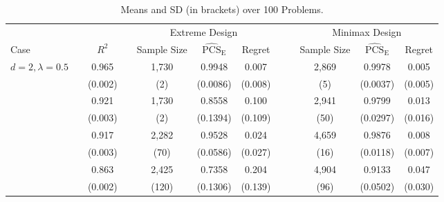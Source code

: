 \documentclass[ijoc,nonblindrev]{informs3}
\def\APCSE{\widehat{\mathrm{PCS}}_{\mathrm{E}}}
\begin{document}
\begin{table}[p]
\centering
\small
\caption{Means and SD (in brackets) over 100 Problems.} \label{tab-PCSE-sd}
\begin{tabular}{lccccccccccc}
\toprule
& & & & \multicolumn{3}{c}{Extreme Design} & & & \multicolumn{3}{c}{Minimax Design} \\
\cmidrule(lr){5-7} \cmidrule(lr){10-12}
Case & & $R^2$ & & Sample Size&  $\APCSE$ & Regret & & & Sample Size&  $\APCSE$ & Regret\\
\midrule
\multirow{2}{*}{$d=2, \lambda=0.5$} & & 0.965 & & 1,730 & 0.9948   & 0.007 & & & 2,869 & 0.9978  & 0.005  \\
                                   & & (0.002)& & (2)   & (0.0086) & (0.008)  & & & (5)   & (0.0037) & (0.005) \\
\addlinespace[1ex]
\multirow{2}{*}{$d=2, \lambda=3$}   & & 0.921 & & 1,730   & 0.8558  & 0.100    & & & 2,941 & 0.9799  & 0.013  \\
                                   & & (0.003) & & (2)   & (0.1394) & (0.109) & & & (50)   & (0.0297) & (0.016) \\
\addlinespace[1ex]
\multirow{2}{*}{$d=3, \lambda=0.5$} & & 0.917 & & 2,282   & 0.9528  & 0.024     & & & 4,659 & 0.9876  & 0.008  \\
                                   & & (0.003) & & (70)   & (0.0586)& (0.027)   & & & (16)   & (0.0118) & (0.007) \\
\addlinespace[1ex]
\multirow{2}{*}{$d=3, \lambda=3$}   & & 0.863 & & 2,425   & 0.7358  & 0.204     & & & 4,904  & 0.9133 & 0.047   \\
                                   & & (0.002) & &(120)   & (0.1306)& (0.139)   & & & (96)   & (0.0502) & (0.030) \\
\bottomrule
\end{tabular}
\end{table}%
\end{document}
